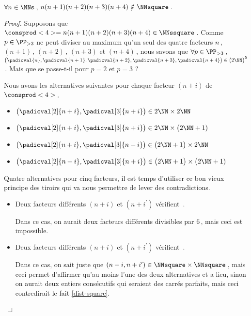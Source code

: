 \begin{fact}
	 $\forall n \in \NNs$\,, $n(n+1)(n+2)(n+3)(n+4) \notin \NNsquare$\,.
\end{fact}


\begin{proof}
    Supposons que $\consprod<4> = n(n+1)(n+2)(n+3)(n+4) \in \NNssquare$\,.
    Comme $p \in \PP_{>3}$ ne peut diviser au maximum qu'un seul des quatre facteurs $n$\,, $(n+1)$\,, $(n+2)$\,, $(n+3)$ et $(n+4)$\,, nous savons que 
    $\forall p \in \PP_{>3}$\,, 
    $\big( \padicval{n} , \padicval{n + 1} , \padicval{n + 2} , \padicval{n + 3} , \padicval{n + 4} \big) \in \big( 2 \NN \big)^5$\,.
    Mais que se passe-t-il pour $p = 2$ et $p = 3$ ?
    
    \medskip
    
    Nous avons les alternatives suivantes pour chaque facteur $(n+i)$ de $\consprod<4>$\,.
    \begin{itemize}
    	\item {} 
		$\big( \padicval[2]{n + i} , \padicval[3]{n + i} \big) \in 2 \NN \times 2 \NN$

    	\item {}
		$\big( \padicval[2]{n + i} , \padicval[3]{n + i} \big) \in 2 \NN \times \big( 2 \NN + 1)$

    	\item {}
		$\big( \padicval[2]{n + i} , \padicval[3]{n + i} \big) \in \big( 2 \NN + 1 \big) \times 2 \NN$

    	\item {}
		$\big( \padicval[2]{n + i} , \padicval[3]{n + i} \big) \in \big( 2 \NN + 1 \big) \times \big( 2 \NN + 1)$
    \end{itemize}
    
    \medskip
    
    Quatre alternatives pour cinq facteurs, il est temps d'utiliser ce bon vieux principe des tiroirs qui va nous permettre de lever des contradictions.
    \begin{itemize}
    	\item Deux facteurs différents $(n+i)$ et $(n+i^\prime)$ vérifient \,.
		
		\noindent
		Dans ce cas, on aurait deux facteurs différents divisibles par $6$\,, mais ceci est impossible.


    	\item Deux facteurs différents $(n+i)$ et $(n+i^\prime)$ vérifient \,.
		
		\noindent
		Dans ce cas, on sait juste que $(n+i, n+i^\prime) \in \NNsquare \times \NNsquare$\,, mais ceci permet d'affirmer qu'au moins l'une des deux alternatives  et  a lieu, sinon on aurait deux entiers consécutifs qui seraient des carrés parfaits, mais ceci contredirait le fait \ref{dist-square}.



\end{itemize}
\end{proof}
